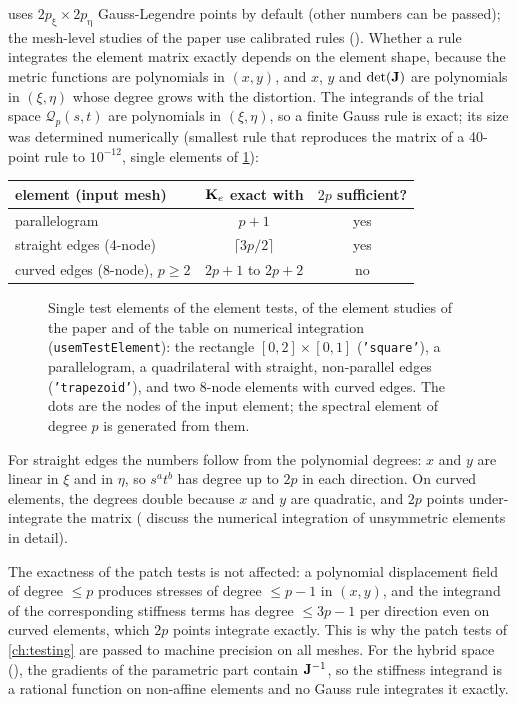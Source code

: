 uses $2p_\upxi\times2p_\upeta$ Gauss-Legendre points by default (other
numbers can be passed); the mesh-level studies of the paper use calibrated rules
(). Whether a rule integrates the element matrix
exactly depends on the element shape, because the metric functions are polynomials
in $(x,y)$, and $x$, $y$ and $\det(\mathbf{J})$ are polynomials in $(\xi,\eta)$ whose
degree grows with the distortion. The integrands of the trial space
$\mathcal Q_p(s,t)$ are polynomials in $(\xi,\eta)$, so a finite Gauss rule is exact;
its size was determined numerically (smallest rule that reproduces the matrix of a
40-point rule to $10^{-12}$, single elements of \cref{fig:test-elements}):
\begin{center}
  \begin{tabular}{@{}lcc@{}}
    \toprule
    element (input mesh) & $\mathbf{K}_e$ exact with & $2p$ sufficient? \\
    \midrule
    parallelogram & $p+1$ & yes \\
    straight edges (4-node) & $\lceil 3p/2\rceil$ & yes \\
    curved edges (8-node), $p\ge2$ & $2p+1$ to $2p+2$ & no \\
    \bottomrule
  \end{tabular}
\end{center}
\begin{figure}[htbp]
  \centering
  
  \caption{Single test elements of the element tests, of the element studies of the
    paper and of the table on numerical integration
    (\texttt{usemTestElement}): the rectangle $[0,2]\times[0,1]$
    (\texttt{'square'}), a parallelogram, a quadrilateral with straight,
    non-parallel edges (\texttt{'trapezoid'}), and two 8-node elements with
    curved edges.
    The dots are the nodes of the input element; the spectral element of degree
    $p$ is generated from them.}
  \label{fig:test-elements}
\end{figure}

For straight edges the numbers follow from the polynomial degrees: $x$ and $y$
are linear in $\xi$ and in $\eta$, so $s^a t^b$ has degree up to $2p$ in each
direction. On curved elements, the degrees double because $x$ and $y$ are
quadratic, and $2p$ points under-integrate the matrix
(\textcite{Eisentraeger2025unsymmetric} discuss the numerical integration of
unsymmetric elements in detail).

The exactness of the patch tests is not affected: a polynomial displacement field
of degree $\le p$ produces stresses of degree $\le p-1$ in $(x,y)$, and the
integrand of the corresponding stiffness terms has degree $\le 3p-1$ per
direction even on curved elements, which $2p$ points integrate exactly. This is
why the patch tests of \cref{ch:testing} are passed to machine precision on all
meshes. For the hybrid space (), the gradients of the
parametric part contain $\mathbf{J}^{-1}$, so the stiffness integrand is a rational
function on non-affine elements and no Gauss rule integrates it exactly.

